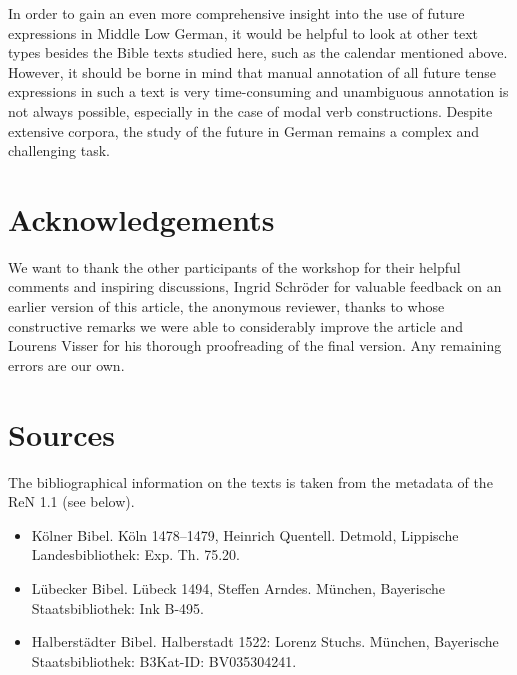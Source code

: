 \documentclass[output=paper,colorlinks,citecolor=brown]{langscibook}
\begin{document}
In order to gain an even more comprehensive insight into the use of future expressions in Middle Low German, it would be helpful to look at other text types besides the Bible texts studied here, such as the calendar mentioned above. However, it should be borne in mind that manual annotation of all future tense expressions in such a text is very time-consuming and unambiguous annotation is not always possible, especially in the case of modal verb constructions. Despite extensive corpora, the study of the future in German remains a complex and challenging task.






\section*{Acknowledgements}
We want to thank the other participants of the workshop for their helpful comments and inspiring discussions, Ingrid Schröder for valuable feedback on an earlier version of this article, the anonymous reviewer, thanks to whose constructive remarks we were able to considerably improve the article and Lourens Visser for his thorough proofreading of the final version. Any remaining errors are our own.


\section*{Sources}

The bibliographical information on the texts is taken from the metadata of the ReN 1.1 (see below).
\begin{itemize}
    \item Kölner Bibel. Köln 1478–1479, Heinrich Quentell. Detmold, Lippische Landesbibliothek: Exp. Th. 75.20. 
    \item Lübecker Bibel. Lübeck 1494, Steffen Arndes. München, Bayerische Staatsbibliothek: Ink B-495.
    \item Halberstädter Bibel. Halberstadt 1522: Lorenz Stuchs. München, Bayerische Staatsbibliothek: B3Kat-ID: BV035304241.
\end{itemize}

\sloppy
\printbibliography[heading=subbibliography,notkeyword=this]
\end{document}
